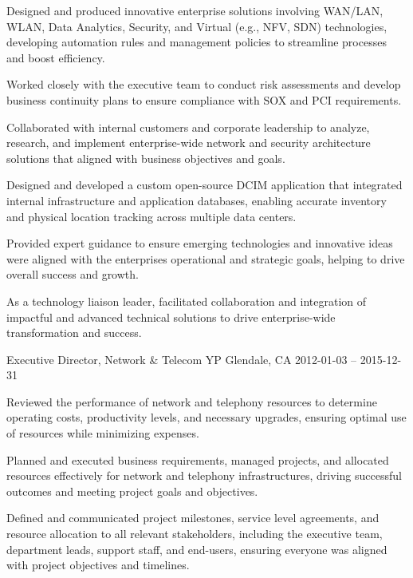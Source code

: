 \documentclass[]{awesome-cv}
\begin{document}
\begin{cventries}
{\begin{cvitems}
		\item {Designed and produced innovative enterprise solutions involving WAN/LAN, WLAN, Data Analytics, Security, and Virtual (e.g., NFV, SDN) technologies, developing automation rules and management policies to streamline processes and boost efficiency.}
		\item {Worked closely with the executive team to conduct risk assessments and develop business continuity plans to ensure compliance with SOX and PCI requirements.}
		\item {Collaborated with internal customers and corporate leadership to analyze, research, and implement enterprise-wide network and security architecture solutions that aligned with business objectives and goals.}
		\item {Designed and developed a custom open-source DCIM application that integrated internal infrastructure and application databases, enabling accurate inventory and physical location tracking across multiple data centers.}
		\item {Provided expert guidance to ensure emerging technologies and innovative ideas were aligned with the enterprise\textquotesingle{}s operational and strategic goals, helping to drive overall success and growth.}
		\item {As a technology liaison leader, facilitated collaboration and integration of impactful and advanced technical solutions to drive enterprise-wide transformation and success.}
		\end{cvitems}}
	\cventry
	{Executive Director, Network \& Telecom}
	{YP}
	{Glendale, CA}
	{2012-01-03 – 2015-12-31}
	{\begin{cvitems}
		\item {Reviewed the performance of network and telephony resources to determine operating costs, productivity levels, and necessary upgrades, ensuring optimal use of resources while minimizing expenses.}
		\item {Planned and executed business requirements, managed projects, and allocated resources effectively for network and telephony infrastructures, driving successful outcomes and meeting project goals and objectives.}
		\item {Defined and communicated project milestones, service level agreements, and resource allocation to all relevant stakeholders, including the executive team, department leads, support staff, and end-users, ensuring everyone was aligned with project objectives and timelines.}
		\end{cvitems}}

\end{cventries}
\end{document}
